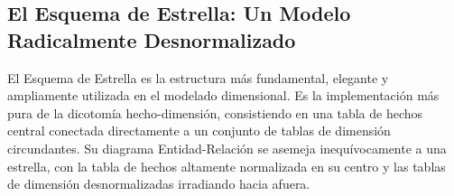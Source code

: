 \documentclass{article}
\begin{document}
\subsection{El Esquema de Estrella: Un Modelo Radicalmente Desnormalizado}
El Esquema de Estrella es la estructura más fundamental, elegante y ampliamente utilizada en el modelado dimensional. Es la implementación más pura de la dicotomía hecho-dimensión, consistiendo en una tabla de hechos central conectada directamente a un conjunto de tablas de dimensión circundantes. Su diagrama Entidad-Relación se asemeja inequívocamente a una estrella, con la tabla de hechos altamente normalizada en su centro y las tablas de dimensión desnormalizadas irradiando hacia afuera.


\end{document}

